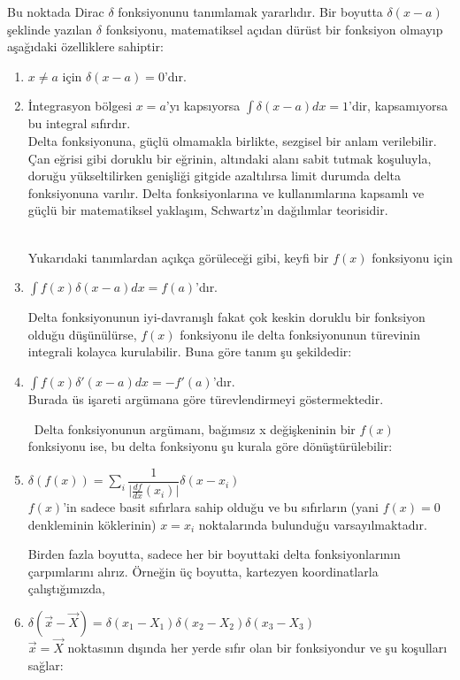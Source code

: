 Bu noktada Dirac $\delta$ fonksiyonunu tanımlamak yararlıdır. Bir boyutta $\delta(x-a)$ şeklinde yazılan $\delta$ fonksiyonu, matematiksel açıdan dürüst bir fonksiyon olmayıp aşağıdaki özelliklere sahiptir:

\begin{enumerate}
  \item $x \neq a$ için $\delta(x-a) = 0$'dır.
  \item İntegrasyon bölgesi $x=a$'yı kapsıyorsa  $\int \delta(x-a) dx = 1$'dir, kapsamıyorsa bu integral sıfırdır. \\ 
 Delta fonksiyonuna, güçlü olmamakla birlikte, sezgisel bir anlam verilebilir. Çan eğrisi gibi doruklu bir eğrinin, altındaki alanı sabit tutmak koşuluyla, doruğu yükseltilirken genişliği gitgide azaltılırsa limit durumda delta fonksiyonuna varılır. Delta fonksiyonlarına ve kullanımlarına kapsamlı ve güçlü bir matematiksel yaklaşım, Schwartz'ın dağılımlar teorisidir. \\
 \ 
 
\quad Yukarıdaki tanımlardan açıkça görüleceği gibi, keyfi bir $f(x)$ fonksiyonu için 
  \item $\int f (x) \delta(x-a) dx = f(a)$'dır.

  Delta fonksiyonunun iyi-davranışlı fakat çok keskin doruklu bir fonksiyon olduğu düşünülürse, $f(x)$ fonksiyonu ile delta fonksiyonunun türevinin integrali kolayca kurulabilir. Buna göre tanım şu şekildedir:
  \item $\int f (x) \delta'(x-a) dx = - f'(a)$'dır.
  \\
  Burada üs işareti argümana göre türevlendirmeyi göstermektedir.
  
  \
  \quad Delta fonksiyonunun argümanı, bağımsız x değişkeninin bir $f(x)$ fonksiyonu ise, bu delta fonksiyonu şu kurala göre dönüştürülebilir:
  \item $\delta (f(x)) = \sum_{i} \dfrac{1}{\big| \frac{df}{dx} (x_{i}) \big|} \delta (x - x_{i})$ 
  \\
  $f(x)$'in sadece basit sıfırlara sahip olduğu ve bu sıfırların (yani $f(x) = 0$ denkleminin köklerinin) $x = x_{i}$ noktalarında bulunduğu varsayılmaktadır.

  Birden fazla boyutta, sadece her bir boyuttaki delta fonksiyonlarının çarpımlarını alırız. Örneğin üç boyutta, kartezyen koordinatlarla çalıştığımızda,

  \item $\delta(\Vec{x} - \Vec{X}) = \delta (x_{1} - X_{1}) \delta (x_{2} - X_{2}) \delta (x_{3} - X_{3})   $ \\
  $\Vec{x} = \Vec{X}$ noktasının dışında her yerde sıfır olan bir fonksiyondur ve şu koşulları sağlar:


\end{enumerate}
